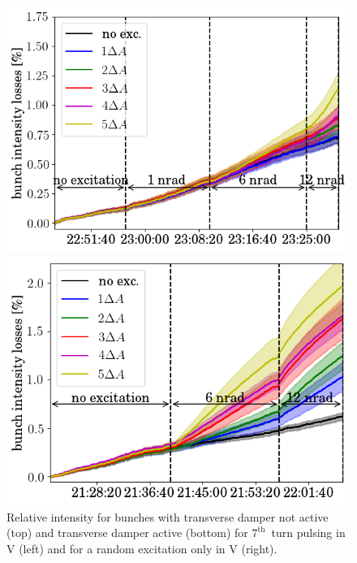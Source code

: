 \documentclass[%
 reprint,
 amsmath,amssymb,
 aps,
prstab,
]{revtex4-1}
\begin{document}
\begin{figure}[h]
\begin{minipage}[t]{0.49\linewidth}
	\end{minipage}	
	\begin{minipage}[t]{0.49\linewidth}
		\centering
		\includegraphics[width=1.0\linewidth]{2017_bunch_intensity_hvran_with_damper_avg.png}
	\end{minipage}	
	\begin{minipage}[t]{0.49\linewidth}
		\centering
		\includegraphics[width=1.0\linewidth]{2017_bunch_intensity_hv7th_with_damper_avg.png}
	\end{minipage}	
	\caption{\label{fig:damp} Relative intensity for bunches with transverse damper not active (top) and transverse damper active (bottom) for $7^{\mathrm{th}}$~turn pulsing in V (left) and for a random excitation only in V (right).}
\end{figure}
\end{document}
